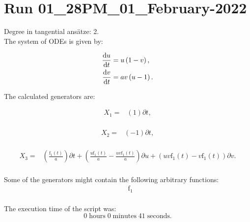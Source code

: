 \section*{Run 01\_28PM\_01\_February-2022}
Degree in tangential ansätze:	2.\\
The system of ODEs is given by:

\begin{align*}
\dv{u}{t}&=u \left(1 - v\right),\\
\dv{v}{t}&=a v \left(u - 1\right).\\
\end{align*}

\noindent The calculated generators are:

\begin{align*}
X_{1}=&\left(1 \right)\partial t,\\
\end{align*}

\begin{align*}
X_{2}=&\left(-1 \right)\partial t,\\
\end{align*}

\begin{align*}
X_{3}=&\left(\frac{\operatorname{f_{1}}{\left(t \right)}}{a} \right)\partial t+\left(\frac{u \operatorname{f_{1}}{\left(t \right)}}{a}- \frac{u v \operatorname{f_{1}}{\left(t \right)}}{a} \right)\partial u+\left(u v \operatorname{f_{1}}{\left(t \right)} - v \operatorname{f_{1}}{\left(t \right)} \right)\partial v.\\
\end{align*}



\noindent Some of the generators might contain the following arbitrary functions:
\begin{align*}
&\operatorname{f_{1}}\\
\end{align*}

\noindent The execution time of the script was:
$$0\;\mathrm{hours}\;0\;\mathrm{minutes}\;41 \;\mathrm{seconds}.$$
